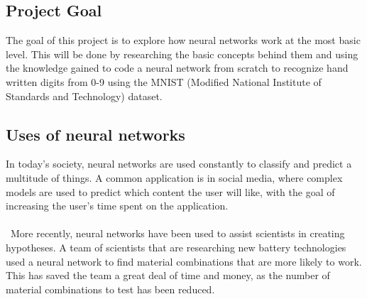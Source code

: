 \documentclass[titlepage]{article}
\begin{document}
\subsection{Project Goal}
The goal of this project is to explore how neural networks work at the most basic level. This will be done by researching the basic concepts behind them and using the knowledge gained to code a neural network from scratch to recognize hand written digits from 0-9 using the MNIST (Modified National Institute of Standards and Technology) dataset.

\subsection{Uses of neural networks}
In today's society, neural networks are used constantly to classify and predict a multitude of things. A common application is in social media, where complex models are used to predict which content the user will like, with the goal of increasing the user's time spent on the application.
\\\\\
More recently, neural networks have been used to assist scientists in creating hypotheses\cite{AI-hypotheses}. A team of scientists that are researching new battery technologies used a neural network to find material combinations that are more likely to work. This has saved the team a great deal of time and money, as the number of material combinations to test has been reduced.
\end{document}
